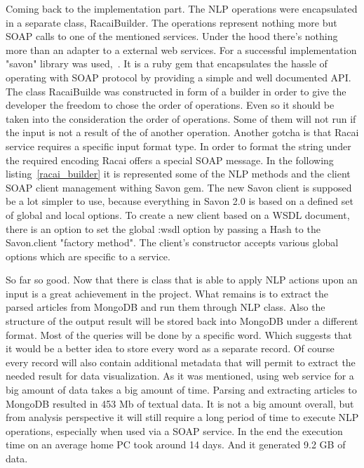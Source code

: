 Coming back to the implementation part. The NLP operations were encapsulated in a separate class, RacaiBuilder. The operations represent nothing more but SOAP calls to one of the mentioned services. Under the hood there's nothing more than an adapter to a external web services. For a successful implementation "savon" library was \mbox{used, \cite{savon_gem}}. It is a ruby gem that encapsulates the hassle of operating with SOAP protocol by providing a simple and well documented API. The class RacaiBuilde was constructed in form of a builder in order to give the developer the freedom to chose the order of operations. Even so it should be taken into the consideration the order of operations. Some of them will not run if the input is not a result of the of another operation. Another gotcha is that Racai service requires a specific input format type. In order to format the string under the required encoding Racai offers a special SOAP message. In the following \mbox{listing \ref{racai_builder}} it is represented some of the NLP methods and the client SOAP client management withing Savon gem. The new Savon client is supposed be a lot simpler to use, because everything in Savon 2.0 is based on a defined set of global and local options. To create a new client based on a WSDL document, there is an option to set the global :wsdl option by passing a Hash to the Savon.client "factory method". The client's constructor accepts various global options which are specific to a service.



So far so good. Now that there is class that is able to apply NLP actions upon an input is a great achievement in the project. What remains is to extract the parsed articles from MongoDB and run them through NLP class. Also the structure of the output result will be stored back into MongoDB under a different format. Most of the queries will be done by a specific word. Which suggests that it would be a better idea to store every word as a separate record. Of course every record will also contain additional metadata that will permit to extract the needed result for data visualization. As it was mentioned, using web service for a big amount of data takes a big amount of time. Parsing and extracting articles to MongoDB resulted in 453 Mb of textual data. It is not a big amount overall, but from analysis perspective it will still require a long period of time to execute NLP operations, especially when used via a SOAP service. In the end the execution time on an average home PC took around 14 days. And it generated 9.2 GB of data.

